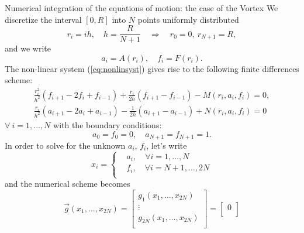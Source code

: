 \begin{section}{Numerical integration of the equations of motion: the case of the Vortex}
  We discretize the interval $[0,R]$ into $N$ points uniformly distributed
  \begin{equation}
    r_i = ih,\quad h = \frac{R}{N+1} \quad\Longrightarrow\quad r_0 = 0,\ r_{N+1} = R,
  \end{equation}
  and we write
  \begin{equation}
    a_i = A(r_i),\quad f_i = F(r_i).
  \end{equation}
  The non-linear system (\ref{eq:nonlinsyst}) gives rise to the following
  finite differences scheme:
  \begin{align}
    \frac{r_i^2}{h^2}\left(f_{i+1}-2f_i+f_{i-1}\right)+\frac{r_i}{2h}\left(f_{i+1}-f_{i-1}\right) - M(r_i, a_i, f_i) = 0,\\
    \frac{r_i}{h^2}\left(a_{i+1}-2a_i+a_{i-1}\right)-\frac{1}{2h}\left(a_{i+1}-a_{i-1}\right) + N(r_i, a_i, f_i) = 0
  \end{align}
  $\forall\ i = 1,\dots,N$ with the boundary conditions:
  \begin{equation}
    a_0 = f_0 = 0,\quad a_{N+1} = f_{N+1} = 1.
  \end{equation}
%    
  In order to solve for the unknown $a_i$, $f_i$, let's write
  \begin{equation}
    x_i =\left\{ 
    \begin{aligned}
      &a_i,\quad\forall i = 1,\dots,N\\
      &f_i,\quad\forall i = N+1,\dots,2N\\
    \end{aligned}\right.
  \end{equation}
  and the numerical scheme becomes
  \begin{equation}
    \vec g(x_1,\dots,x_{2N}) = 
    \begin{bmatrix}
      g_1(x_1, \dots, x_{2N})\\
      \vdots\\
      g_{2N}(x_1, \dots, x_{2N})\\
    \end{bmatrix}
    = 
    \begin{bmatrix}
      0\\

\end{bmatrix}
\end{equation}
\end{section}
